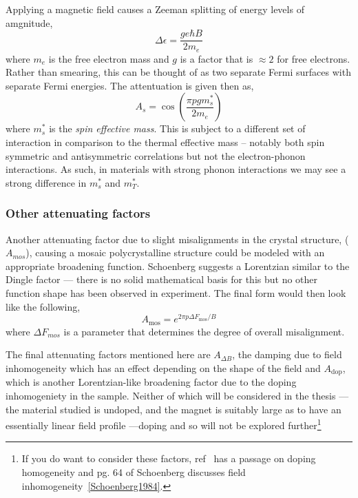Applying a magnetic field causes a Zeeman splitting of energy levels of amgnitude,
\begin{equation}
  \Delta\epsilon = \frac{g e \hbar B}{2 m_e}
\end{equation}
where $m_e$ is the free electron mass and $g$ is a factor that is $\approx2$ for free electrons. Rather than smearing, this can be thought of as two separate Fermi surfaces with separate Fermi energies. The attentuation is given then as,
\begin{equation}
  A_s = \cos\left(\frac{\pi p g m^*_s}{2m_e}\right)
\end{equation}
where $m^*_s$ is the \textit{spin effective mass}. This is subject to a different set of interaction in comparison to the thermal effective mass -- notably both spin symmetric and antisymmetric correlations but not the electron-phonon interactions. As such, in materials with strong phonon interactions we may see a strong difference in $m^*_s$ and $m^*_T$.

\subsubsection{Other attenuating factors}

Another attenuating factor due to slight misalignments in the crystal structure, ($A_{mos}$), causing a mosaic polycrystalline structure could be modeled with an appropriate broadening function. Schoenberg suggests a Lorentzian similar to the Dingle factor --- there is no solid mathematical basis for this but no other function shape has been observed in experiment. The final form would then look like the following,
\begin{equation}
  A_{\textrm{mos}} = e^{2\pi p \Delta F_{\textrm{mos}}/B}
\end{equation}
where $\Delta F_{mos}$ is a parameter that determines the degree of overall misalignment.

The final attenuating factors mentioned here are $A_{\Delta B}$, the damping due to field inhomogeneity which has an effect depending on the shape of the field and $A_{\textrm{dop}}$, which is another Lorentzian-like broadening factor due to the doping inhomogeniety in the sample. Neither of which will be considered in the thesis --- the material studied is undoped, and the magnet is suitably large as to have an essentially linear field profile ---doping and so will not be explored further\footnote{If you do want to consider these factors, ref~\cite{Rourke2010b} has a passage on doping homogeneity and pg. 64 of Schoenberg discusses field inhomogeneity~\ref{Schoenberg1984}.}

